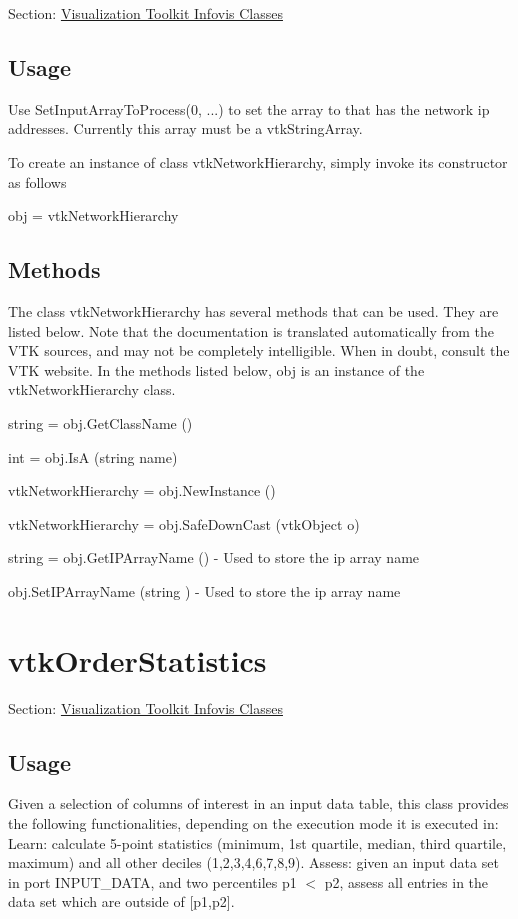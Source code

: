 Section\-: \hyperlink{sec_vtkinfovis}{Visualization Toolkit Infovis Classes} \hypertarget{vtkwidgets_vtkxyplotwidget_Usage}{}\subsection{Usage}\label{vtkwidgets_vtkxyplotwidget_Usage}
Use Set\-Input\-Array\-To\-Process(0, ...) to set the array to that has the network ip addresses. Currently this array must be a vtk\-String\-Array.

To create an instance of class vtk\-Network\-Hierarchy, simply invoke its constructor as follows \begin{DoxyVerb}  obj = vtkNetworkHierarchy
\end{DoxyVerb}
 \hypertarget{vtkwidgets_vtkxyplotwidget_Methods}{}\subsection{Methods}\label{vtkwidgets_vtkxyplotwidget_Methods}
The class vtk\-Network\-Hierarchy has several methods that can be used. They are listed below. Note that the documentation is translated automatically from the V\-T\-K sources, and may not be completely intelligible. When in doubt, consult the V\-T\-K website. In the methods listed below, {\ttfamily obj} is an instance of the vtk\-Network\-Hierarchy class. 
\begin{DoxyItemize}
\item {\ttfamily string = obj.\-Get\-Class\-Name ()}  
\item {\ttfamily int = obj.\-Is\-A (string name)}  
\item {\ttfamily vtk\-Network\-Hierarchy = obj.\-New\-Instance ()}  
\item {\ttfamily vtk\-Network\-Hierarchy = obj.\-Safe\-Down\-Cast (vtk\-Object o)}  
\item {\ttfamily string = obj.\-Get\-I\-P\-Array\-Name ()} -\/ Used to store the ip array name  
\item {\ttfamily obj.\-Set\-I\-P\-Array\-Name (string )} -\/ Used to store the ip array name  
\end{DoxyItemize}\hypertarget{vtkinfovis_vtkorderstatistics}{}\section{vtk\-Order\-Statistics}\label{vtkinfovis_vtkorderstatistics}
Section\-: \hyperlink{sec_vtkinfovis}{Visualization Toolkit Infovis Classes} \hypertarget{vtkwidgets_vtkxyplotwidget_Usage}{}\subsection{Usage}\label{vtkwidgets_vtkxyplotwidget_Usage}
Given a selection of columns of interest in an input data table, this class provides the following functionalities, depending on the execution mode it is executed in\-: Learn\-: calculate 5-\/point statistics (minimum, 1st quartile, median, third quartile, maximum) and all other deciles (1,2,3,4,6,7,8,9). Assess\-: given an input data set in port I\-N\-P\-U\-T\-\_\-\-D\-A\-T\-A, and two percentiles p1 $<$ p2, assess all entries in the data set which are outside of \mbox{[}p1,p2\mbox{]}.

